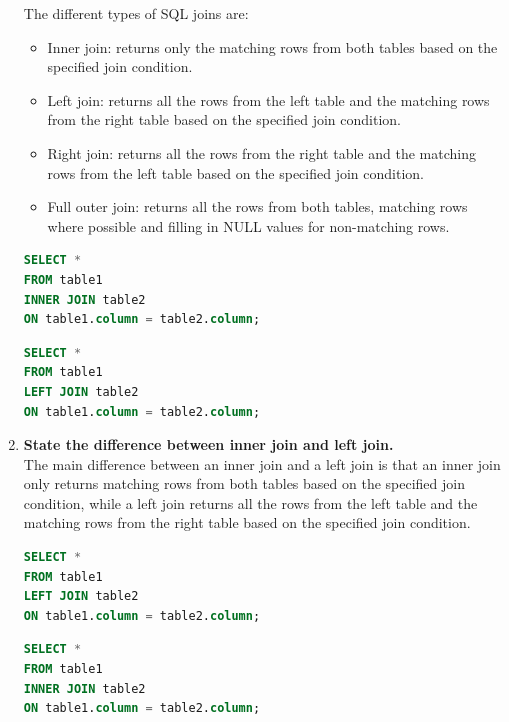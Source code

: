 \documentclass[11pt]{article}
\begin{document}
\begin{enumerate}
	      The different types of SQL joins are:

	      \begin{itemize}
		      \item Inner join: returns only the matching rows from both tables based on the specified join condition.

		      \item Left join: returns all the rows from the left table and the matching rows from the right table based on the specified join condition.

		      \item Right join: returns all the rows from the right table and the matching rows from the left table based on the specified join condition.

		      \item Full outer join: returns all the rows from both tables, matching rows where possible and filling in NULL values for non-matching rows.

	      \end{itemize}

	      \begin{lstlisting}[language=sql]
SELECT *
FROM table1
INNER JOIN table2
ON table1.column = table2.column;
	\end{lstlisting}

	      \begin{lstlisting}[language=sql]
SELECT *
FROM table1
LEFT JOIN table2
ON table1.column = table2.column;
\end{lstlisting}



	\item \textbf{State the difference between inner join and left join.}\\

	      The main difference between an inner join and a left join is that an inner join only returns matching rows from both tables based on the specified join condition, while a left join returns all the rows from the left table and the matching rows from the right table based on the specified join condition.

	      \begin{lstlisting}[language=sql]
SELECT *
FROM table1
LEFT JOIN table2
ON table1.column = table2.column;
\end{lstlisting}

	      \begin{lstlisting}[language=sql]
SELECT *
FROM table1
INNER JOIN table2
ON table1.column = table2.column;
\end{lstlisting}


\end{enumerate}
\end{document}
